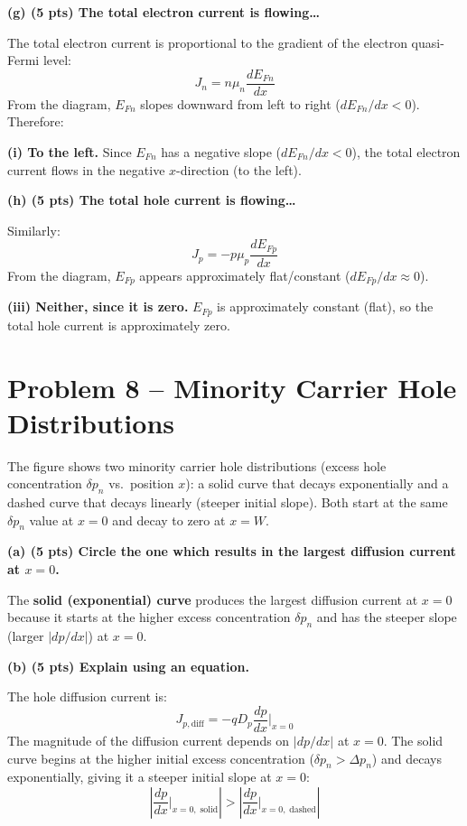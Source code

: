 \documentclass[11pt]{article}
\begin{document}
\textbf{(g) (5 pts) The total electron current is flowing\ldots}

The total electron current is proportional to the gradient of the electron quasi-Fermi level:
\[
  J_n = n\mu_n \frac{dE_{Fn}}{dx}
\]
From the diagram, $E_{Fn}$ slopes downward from left to right ($dE_{Fn}/dx < 0$). Therefore:

\begin{answerbox}
  \textbf{(i) To the left.} Since $E_{Fn}$ has a negative slope ($dE_{Fn}/dx < 0$), the total electron current flows in the negative $x$-direction (to the left).
\end{answerbox}

\textbf{(h) (5 pts) The total hole current is flowing\ldots}

Similarly:
\[
  J_p = -p\mu_p \frac{dE_{Fp}}{dx}
\]
From the diagram, $E_{Fp}$ appears approximately flat/constant ($dE_{Fp}/dx \approx 0$).

\begin{answerbox}
  \textbf{(iii) Neither, since it is zero.} $E_{Fp}$ is approximately constant (flat), so the total hole current is approximately zero.
\end{answerbox}

\newpage

\section*{Problem 8 -- Minority Carrier Hole Distributions}

The figure shows two minority carrier hole distributions (excess hole concentration $\delta p_n$ vs.\ position $x$): a solid curve that decays exponentially and a dashed curve that decays linearly (steeper initial slope). Both start at the same $\delta p_n$ value at $x=0$ and decay to zero at $x = W$.

\textbf{(a) (5 pts) Circle the one which results in the largest diffusion current at $x=0$.}

\begin{answerbox}
  The \textbf{solid (exponential) curve} produces the largest diffusion current at $x=0$ because it starts at the higher excess concentration $\delta p_n$ and has the steeper slope (larger $|dp/dx|$) at $x=0$.
\end{answerbox}

\textbf{(b) (5 pts) Explain using an equation.}

The hole diffusion current is:
\[
  J_{p,\text{diff}} = -qD_p \frac{dp}{dx}\bigg|_{x=0}
\]
The magnitude of the diffusion current depends on $|dp/dx|$ at $x=0$. The solid curve begins at the higher initial excess concentration ($\delta p_n > \Delta p_n$) and decays exponentially, giving it a steeper initial slope at $x = 0$:
\[
  \left|\frac{dp}{dx}\bigg|_{x=0,\;\text{solid}}\right| > \left|\frac{dp}{dx}\bigg|_{x=0,\;\text{dashed}}\right|
\]
\end{document}
